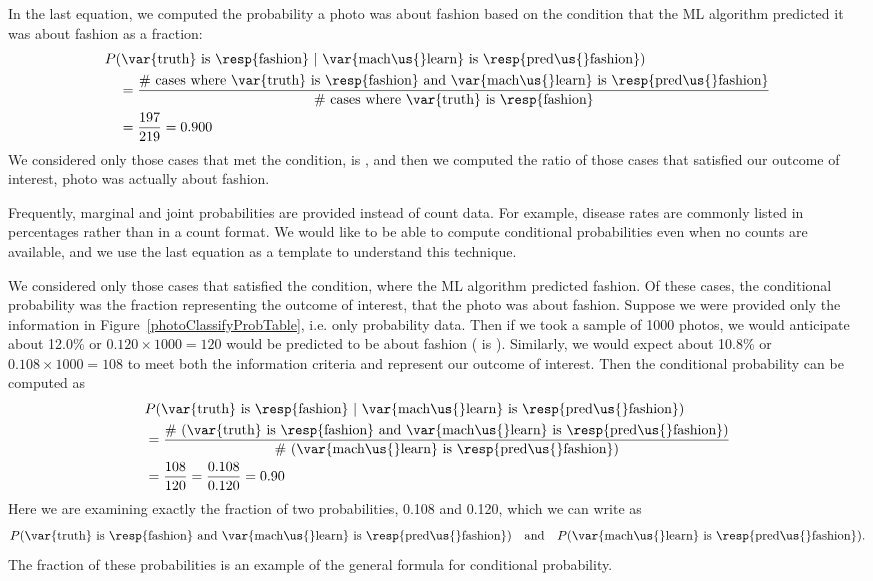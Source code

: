 In the last equation, we computed the probability a photo
was about fashion based on the condition that the ML algorithm
predicted it was about fashion as a fraction:
\begin{align*}
& P(\text{\var{truth} is \resp{fashion}\ }|
    \text{\ \var{mach\us{}learn} is \resp{pred\us{}fashion}}) \\
  &\quad = \frac{\text{\# cases where \var{truth} is \resp{fashion}
       and \var{mach\us{}learn} is \resp{pred\us{}fashion}}}
     {\text{\# cases where \var{truth} is \resp{fashion}}} \\
  &\quad = \frac{\fashYY{}}{\fashYA{}}
      = 0.900
\end{align*}
We considered only those cases that met the condition,
 is , and then
we computed the ratio of those cases that satisfied our
outcome of interest, photo was actually about fashion.

Frequently, marginal and joint probabilities are provided
instead of count data.
For example, disease rates are commonly listed in percentages
rather than in a count format.
We would like to be able to compute conditional probabilities
even when no counts are available, and we use the last equation
as a template to understand this technique.

We considered only those cases that satisfied the condition,
where the ML algorithm predicted fashion.
Of these cases, the conditional probability was the
fraction representing the outcome of interest, that the
photo was about fashion.
Suppose we were provided only the information in
Figure~\ref{photoClassifyProbTable}, i.e. only probability data.
Then if we took a sample of 1000 photos, we would anticipate
about 12.0\% or $0.120\times 1000 = 120$ would be predicted to be
about fashion ( is ).
Similarly, we would expect about 10.8\% or
$0.108\times 1000 = 108$ to meet both the information criteria
and represent our outcome of interest.
Then the conditional probability can be computed as
\begin{align*}
&P(\text{\var{truth} is \resp{fashion}}\ |\ 
    \text{\var{mach\us{}learn} is \resp{pred\us{}fashion}}) \\
  &= \frac{\text{\# (\var{truth} is \resp{fashion}
      and \var{mach\us{}learn} is \resp{pred\us{}fashion})}}
    {\text{\# (\var{mach\us{}learn} is \resp{pred\us{}fashion})}} \\
  &= \frac{108}{120}
		= \frac{0.108}{0.120}
		= 0.90
\end{align*}
Here we are examining exactly the fraction of two probabilities,
0.108 and 0.120, which we can write as
\begin{align*}
P(\text{\var{truth} is \resp{fashion} and
    \var{mach\us{}learn} is \resp{pred\us{}fashion}})
\quad\text{and}\quad
P(\text{\var{mach\us{}learn} is \resp{pred\us{}fashion}}).
\end{align*}
The fraction of these probabilities is an example of the
general formula for conditional probability.

